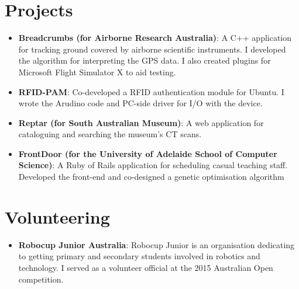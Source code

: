 \documentclass[a4paper,11pt]{article}
\newcommand{\resumeItem}[2]{
  \item\small{
    \textbf{#1}{: #2 \vspace{-2pt}}
  }
}
\newcommand{\resumeSubHeadingListStart}{\begin{itemize}[label={}, leftmargin=*]}
\newcommand{\resumeSubHeadingListEnd}{\end{itemize}}
\begin{document}
\section{Projects}
\resumeSubHeadingListStart
\resumeItem{Breadcrumbs (for Airborne Research Australia)}
    {A C++ application for tracking ground covered by airborne scientific instruments. I developed the algorithm for interpreting the GPS data. I also created plugins for Microsoft Flight Simulator X to aid testing.}
\resumeItem{RFID-PAM}
    {Co-developed a RFID authentication module for Ubuntu. I wrote the Arudino code and PC-side driver for I/O with the device.}
\resumeItem{Reptar (for South Australian Museum)}
    {A web application for cataloguing and searching the museum's CT scans.}
\resumeItem{FrontDoor (for the University of Adelaide School of Computer Science)}
    {A Ruby of Rails application for scheduling casual teaching staff. Developed the front-end and co-designed a genetic optimisation algorithm}
\resumeSubHeadingListEnd

\section{Volunteering}
\resumeSubHeadingListStart
\resumeItem{Robocup Junior Australia}
    {Robocup Junior is an organisation dedicating to getting primary and secondary students involved in robotics and technology. I served as a volunteer official at the 2015 Australian Open competition.}
\resumeSubHeadingListEnd

\end{document}
